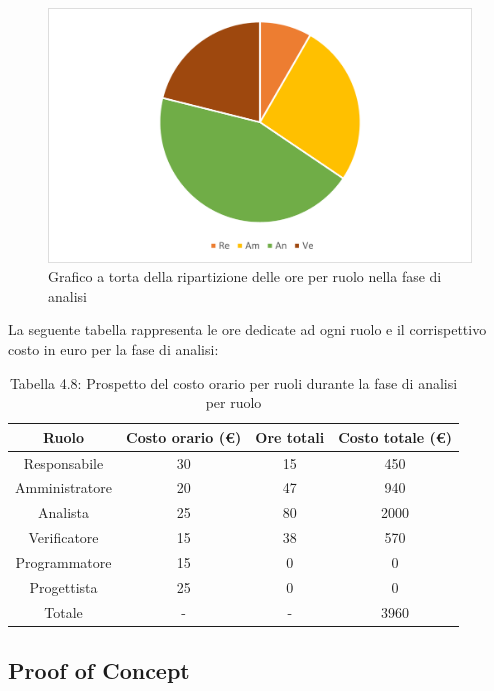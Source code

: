 \begin{figure}[H]
    \centering
    \includegraphics[scale=0.6]{img/grafi preventivo/torta/analisi/complessivo.png}
    \caption{Grafico a torta della ripartizione delle ore per ruolo nella fase di analisi}
\end{figure}
La seguente tabella rappresenta le ore dedicate ad ogni ruolo e il corrispettivo costo in euro per la fase di analisi:
\begin{table}[h]
	\setlength\extrarowheight{5pt}
	\centering
	\begin{tabularx}{\textwidth}{|ccc|c|}
		\hline
		\rowcolor{white}
		\textbf{Ruolo} & \textbf{Costo orario (€)} & \textbf{Ore totali} & \textbf{Costo totale (€)} \\
		\hline
		Responsabile &30&15&450 \\
		Amministratore &20&47&940 \\
		Analista &25&80&2000 \\
		Verificatore &15&38&570 \\
		Programmatore &15&0&0 \\
		Progettista &25&0&0 \\
		\hline
		Totale &-&-&3960 \\
		\hline
	\end{tabularx}
    \vspace{10pt}
	\caption{Tabella 4.8: Prospetto del costo orario per ruoli durante la fase di analisi per ruolo}
\end{table}
%
\newpage
\subsection{Proof of Concept}

